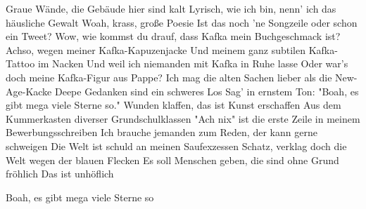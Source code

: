 \begin{guitar}
	Graue Wände, die Gebäude hier sind kalt
	Lyrisch, wie ich bin, nenn' ich das häusliche Gewalt
	Woah, krass, große Poesie
	Ist das noch 'ne Songzeile oder schon ein Tweet?
	Wow, wie kommst du drauf, dass Kafka mein Buchgeschmack ist?
	Achso, wegen meiner Kafka-Kapuzenjacke
	Und meinem ganz subtilen Kafka-Tattoo im Nacken
	Und weil ich niemanden mit Kafka in Ruhe lasse
	Oder war's doch meine Kafka-Figur aus Pappe?
	Ich mag die alten Sachen lieber als die New-Age-Kacke
	Deepe Gedanken sind ein schweres Los
	Sag' in ernstem Ton: "Boah, es gibt mega viele Sterne so."
	Wunden klaffen, das ist Kunst erschaffen
	Aus dem Kummerkasten diverser Grundschulklassen
	"Ach nix" ist die erste Zeile in meinem Bewerbungsschreiben
	Ich brauche jemanden zum Reden, der kann gerne schweigen
	Die Welt ist schuld an meinen Saufexzessen
	Schatz, verklag doch die Welt wegen der blauen Flecken
	Es soll Menschen geben, die sind ohne Grund fröhlich
	Das ist unhöflich
	
	\begin{highlightbar}
		 
	\end{highlightbar}
	
	 
	Boah, es gibt mega viele Sterne so
\end{guitar}
